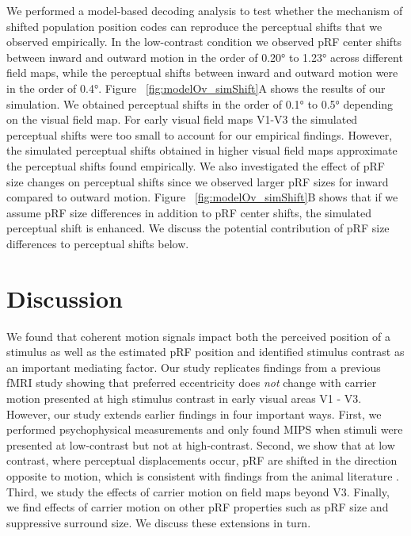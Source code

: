 We performed a model-based decoding analysis to test whether the mechanism of shifted population position codes can reproduce the perceptual shifts that we observed empirically. In the low-contrast condition we observed pRF center shifts between inward and outward motion in the order of 0.20° to 1.23° across different field maps, while the perceptual shifts between inward and outward motion were in the order of 0.4°. Figure ~\ref{fig:modelOv_simShift}A shows the results of our simulation. We obtained perceptual shifts in the order of 0.1° to 0.5° depending on the visual field map. For early visual field maps V1-V3 the simulated perceptual shifts were too small to account for our empirical findings. However, the simulated perceptual shifts obtained in higher visual field maps approximate the perceptual shifts found empirically. We also investigated the effect of pRF size changes on perceptual shifts since we observed larger pRF sizes for inward compared to outward motion. Figure ~\ref{fig:modelOv_simShift}B shows that if we assume pRF size differences in addition to pRF center shifts, the simulated perceptual shift is enhanced. We discuss the potential contribution of pRF size differences to perceptual shifts below.

\section{Discussion}
We found that coherent motion signals impact both the perceived position of a stimulus as well as the estimated pRF position and identified stimulus contrast as an important mediating factor. Our study replicates findings from a previous fMRI study showing that preferred eccentricity does \textit{not} change with carrier motion presented at high stimulus contrast in early visual areas V1 - V3. However, our study extends earlier findings in four important ways. First, we performed psychophysical measurements and only found MIPS when stimuli were presented at low-contrast but not at high-contrast. Second, we show that at low contrast, where perceptual displacements occur, pRF are shifted in the direction opposite to motion, which is consistent with findings from the animal literature \parencite{Fu2004}. Third, we study the effects of carrier motion on field maps beyond V3. Finally, we find effects of carrier motion on other pRF properties such as pRF size and suppressive surround size. We discuss these extensions in turn.

